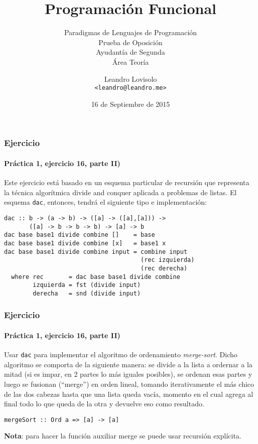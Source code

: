 \documentclass[spanish]{beamer}
\title{Programación Funcional}
\subtitle{
  Paradigmas de Lenguajes de Programación \\
  \vspace{2em}
  Prueba de Oposición \\
  Ayudantía de Segunda \\
  Área Teoría
}
\author{Leandro Lovisolo \\ \footnotesize{\texttt{<leandro@leandro.me>}}}
\date{16 de Septiembre de 2015}
\institute{
  Departamento de Computación \\
  Facultad de Ciencias Exactas y Naturales \\
  Universidad de Buenos Aires
}
\begin{document}
\begin{frame}
  \titlepage
\end{frame}

\begin{frame}[fragile]
  \frametitle{Ejercicio}
  \framesubtitle{Práctica 1, ejercicio 16, parte II)}

  Este ejercicio está basado en un esquema particular de recursión que
  representa la técnica algorítmica divide and conquer aplicada a problemas de
  listas. El esquema \texttt{dac}, entonces, tendrá el siguiente tipo e
  implementación:

  \begin{Verbatim}
dac :: b -> (a -> b) -> ([a] -> ([a],[a])) ->
       ([a] -> b -> b -> b) -> [a] -> b
dac base base1 divide combine []    = base
dac base base1 divide combine [x]   = base1 x
dac base base1 divide combine input = combine input
                                      (rec izquierda)
                                      (rec derecha)
  where rec       = dac base base1 divide combine
        izquierda = fst (divide input)
        derecha   = snd (divide input)
  \end{Verbatim}
\end{frame}

\begin{frame}
  \frametitle{Ejercicio}
  \framesubtitle{Práctica 1, ejercicio 16, parte II)}

  Usar \texttt{dac} para implementar el algoritmo de ordenamiento
  \textit{merge-sort}. Dicho algoritmo se comporta de la siguiente manera: se
  divide a la lista a ordernar a la mitad (si es impar, en 2 partes lo más
  iguales posibles), se ordenan esas partes y luego se fusionan (``merge'') en
  orden lineal, tomando iterativamente el más chico de las dos cabezas hasta
  que una lista queda vacía, momento en el cual agrega al final todo lo que
  queda de la otra y devuelve eso como resultado.

  \vspace{1em}

  \texttt{mergeSort :: Ord a => [a] -> [a]}

  \vspace{1em}

  \textbf{Nota}: para hacer la función auxiliar merge se puede usar recursión
  explícita.
\end{frame}
\end{document}
